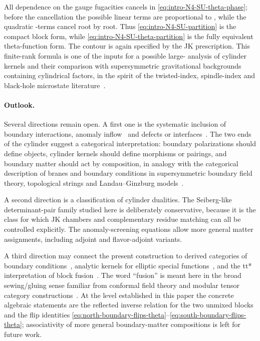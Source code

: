 \documentclass[11pt,a4paper]{article}
\makeatletter
\numberwithin{equation}{section}
\theoremstyle{plain}
\theoremstyle{definition}
\theoremstyle{remark}
\newcounter{mathrecordid}
\newcommand{\mathboxbegin}[1]{%
  \stepcounter{mathrecordid}%
  \immediate\write\mathrecords{\themathrecordid,#1}%
  \special{pdf:bann << /Type /Annot /Subtype /Link /Border [0 0 0]
    /MathBoxID \themathrecordid /F 2
    /A << /S /URI /URI (urn:mathbox:\themathrecordid) >> >>}}
\newcommand{\mathboxinlineplain}[1]{$#1$}
\newcommand{\mathboxinline}[1]{%
  $\mathboxbegin{inline}%
  \special{pdf:literal direct /MathBoxBegin\themathrecordid\space MP}%
  #1\special{pdf:literal direct /MathBoxEnd\themathrecordid\space MP}%
  \special{pdf:eann}$}
\newcommand{\recordmath}{%
  \ifmeasuring@\expandafter\mathboxinlineplain
  \else\expandafter\mathboxinline\fi}
\makeatother
\begin{document}
All dependence on the gauge fugacities cancels in \eqref{eq:intro-N4-SU-theta-phase}; before the cancellation the possible linear terms are proportional to \recordmath{\sum_{a\neq b}u_{ab}=0}, while the quadratic \recordmath{u_{ab}}-terms cancel root by root.  Thus \eqref{eq:intro-N4-SU-partition} is the compact block form, while \eqref{eq:intro-N4-SU-theta-partition} is the fully equivalent theta-function form.
The contour is again specified by the JK prescription. This finite-rank formula is one of the inputs for a possible large-\recordmath{N} analysis of cylinder kernels and their comparison with supersymmetric gravitational backgrounds containing cylindrical factors, in the spirit of the twisted-index, spindle-index and black-hole microstate literature~\cite{Hosseini:2016tor,Hosseini:2019lkt,Hong:2018viz,Inglese:2023wky,Colombo:2024mts}.

 

\paragraph{Outlook.}

Several directions remain open.  A first one is the systematic inclusion of     boundary interactions, anomaly inflow~\cite{Callan:1984sa} and defects or interfaces~\cite{Dimofte:2017tpi}.  The two ends of the cylinder suggest a categorical interpretation: boundary polarizations should define objects, cylinder kernels should define morphisms or pairings, and boundary matter should act by composition, in analogy with the categorical description of branes and boundary conditions in supersymmetric boundary field theory, topological strings and Landau--Ginzburg models~\cite{Gaiotto:2008sa,Douglas:2000gi,Kapustin:2002bi,Herbst:2008jq}.

A second direction is a classification of cylinder dualities.  The Seiberg-like determinant-pair family studied here is deliberately conservative, because it is the class for which JK chambers and complementary residue matching can all be controlled explicitly.  The anomaly-screening equations allow more general matter assignments, including adjoint and flavor-adjoint variants.   

A third direction   may connect the present construction to derived categories of boundary conditions~\cite{Douglas:2000gi,Kapustin:2002bi,Herbst:2008jq}, analytic kernels for elliptic special functions~\cite{Felder:1999mq,Narukawa:2003}, and the tt* interpretation of block fusion~\cite{Cecotti:1991me,Cecotti:2013mba}.  The word ``fusion'' is meant here in the broad sewing/gluing sense familiar from conformal field theory and modular tensor category constructions~\cite{Moore:1988qv,Fuchs:2002cm}.  At the level established in this paper the concrete algebraic statements are the reflected inverse relation for the two unmixed blocks and the flip identities \eqref{eq:north-boundary-flips-theta}--\eqref{eq:south-boundary-flips-theta}; associativity of more general boundary-matter compositions is left for future work.
\end{document}
